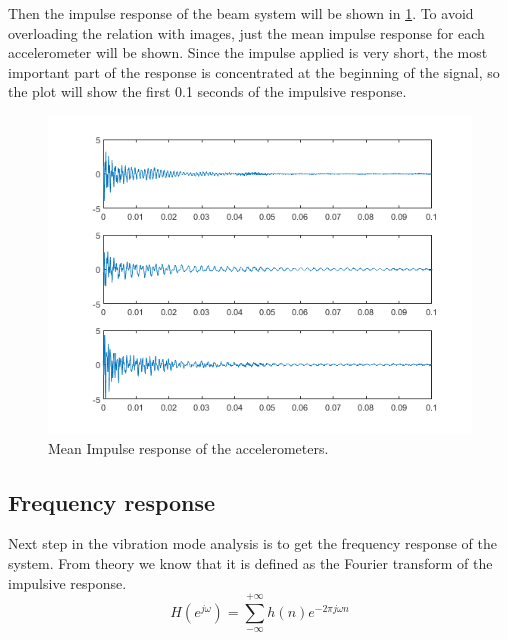 \documentclass[12pt,a4paper,twoside]{article}
\begin{document}
Then the impulse response of the beam system will be shown in \figurename{ \ref{meanimp}}. To avoid overloading the relation with images, just the mean impulse response for each accelerometer will be shown. Since the impulse applied is very short, the most important part of the response is concentrated at the beginning of the signal, so the plot will show the first 0.1 seconds of the impulsive response.

\begin{figure}[h!]
	\centering
	\includegraphics[width=0.9\linewidth]{Images/meanimp.png}
	\caption{Mean Impulse response of the accelerometers.}
	\label{meanimp}
\end{figure}
\noindent

\subsection{Frequency response}
Next step in the vibration mode analysis is to get the frequency response of the system. From theory we know that it is defined as the Fourier transform of the impulsive response.
\begin{equation}
	H(e^{j\omega}) =\sum_{-\infty}^{+\infty}h(n)e^{-2\pi j \omega n}
	\label{Qn}
\end{equation}
\end{document}
